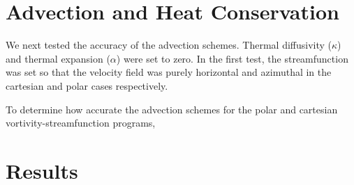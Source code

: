 \documentclass{article}
\begin{document}
\section*{Advection and Heat Conservation }

We next tested the accuracy of the advection schemes. Thermal diffusivity ($\kappa$) and thermal expansion ($\alpha$) were set to zero. In the first test, the streamfunction was set so that the velocity field was purely horizontal and azimuthal in the cartesian and polar cases respectively. 






To determine how accurate the advection schemes for the polar and cartesian vortivity-streamfunction programs, 


\section*{Results}

\section*{}
\end{document}
